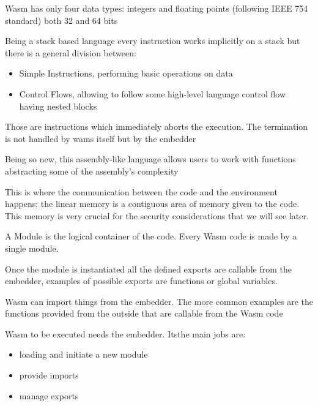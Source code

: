 \documentclass[../main.tex]{subfiles}
\begin{document}
\begin{description}[font=$\bullet$ \scshape\bfseries]
  \item[Values]
        Wasm has only four data types: integers and floating points (following IEEE 754 standard) both 32 and 64 bits
  \item[Instructions]
        Being a stack based language every instruction works implicitly on a stack but there is a general division between:
        \begin{itemize}
          \item Simple Instructions, performing basic operations on data
          \item Control Flows, allowing to follow some high-level language control flow having nested blocks
        \end{itemize}
  \item[Traps]
        Those are instructions which immediately aborts the execution. The termination is not handled by wams itself but by the embedder
  \item[Functions]
        Being so new, this assembly-like language allows users to work with functions abstracting some of the assembly's complexity
  \item[Linear Memory]
        This is where the communication between the code and the environment happens: the linear memory is a contiguous area of memory given to the code. This memory is very crucial for the security considerations that we will see later.
  \item[Modules]
        A Module is the logical container of the code. Every Wasm code is made by a single module.
  \item[Exports] Once the module is instantiated all the defined exports are callable from the embedder, examples of possible exports are functions or global variables.
  \item[Imports] Wasm can import things from the embedder. The more common examples are the functions provided from the outside that are callable from the Wasm code
  \item[Embedder]
        Wasm to be executed needs the embedder. Itsthe main jobs are:
        \begin{itemize}
          \item loading and initiate a new module
          \item provide imports
          \item manage exports
        \end{itemize}
\end{description}
\end{document}
